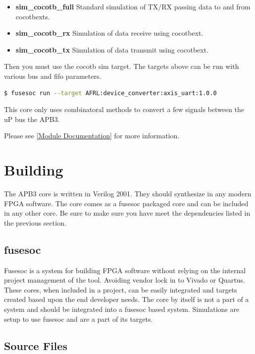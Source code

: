 \begin{itemize}
  \item \textbf{sim\_cocotb\_full} Standard simulation of TX/RX passing data to and from cocotbexts.
  \item \textbf{sim\_cocotb\_rx} Simulation of data receive using cocotbext.
  \item \textbf{sim\_cocotb\_tx} Simulation of data transmit using cocotbext.
\end{itemize}

Then you must use the cocotb sim target. The targets above can be run with various bus and fifo parameters.
\begin{lstlisting}[language=bash]
  $ fusesoc run --target AFRL:device_converter:axis_uart:1.0.0
\end{lstlisting}
This core only uses combinatoral methods to convert a few signals between the uP bus the APB3.

Please see \ref{Module Documentation} for more information.

\section{Building}

\par
The APB3 core is written in Verilog 2001. They should synthesize in any modern FPGA software. The core comes as a fusesoc packaged core and can be
included in any other core. Be sure to make sure you have meet the dependencies listed in the previous section.

\subsection{fusesoc}
\par
Fusesoc is a system for building FPGA software without relying on the internal project management of the tool. Avoiding vendor lock in to Vivado or Quartus.
These cores, when included in a project, can be easily integrated and targets created based upon the end developer needs. The core by itself is not a part of
a system and should be integrated into a fusesoc based system. Simulations are setup to use fusesoc and are a part of its targets.

\subsection{Source Files}



